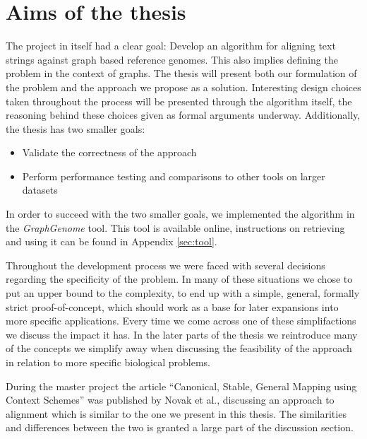 \documentclass[thesis.tex]{subfiles}
\begin{document}
\section{Aims of the thesis}
The project in itself had a clear goal: Develop an algorithm for aligning text strings against graph based reference genomes. This also implies defining the problem in the context of graphs. The thesis will present both our formulation of the problem and the approach we propose as a solution. Interesting design choices taken throughout the process will be presented through the algorithm itself, the reasoning behind these choices given as formal arguments underway. Additionally, the thesis has two smaller goals:
\begin{itemize}
  \item Validate the correctness of the approach
  \item Perform performance testing and comparisons to other tools on larger datasets
\end{itemize}
In order to succeed with the two smaller goals, we implemented the algorithm in the \textit{GraphGenome} tool. This tool is available online, instructions on retrieving and using it can be found in Appendix \ref{sec:tool}.\\
\par\noindent
Throughout the development process we were faced with several decisions regarding the specificity of the problem. In many of these situations we chose to put an upper bound to the complexity, to end up with a simple, general, formally strict proof-of-concept, which should work as a base for later expansions into more specific applications.  Every time we come across one of these simplifactions we discuss the impact it has. In the later parts of the thesis we reintroduce many of the concepts we simplify away when discussing the feasibility of the approach in relation to more specific biological problems.\\
\par\noindent
During the master project the article ``Canonical, Stable, General Mapping using Context Schemes'' was published by Novak et al., discussing an approach to alignment which is similar to the one we present in this thesis. The similarities and differences between the two is granted a large part of the discussion section.
\end{document}
